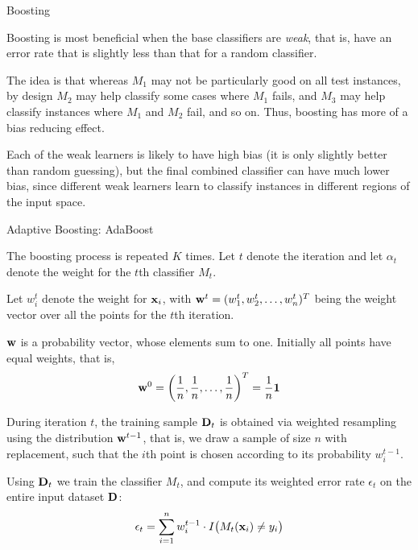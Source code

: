 \begin{frame}{Boosting}

  Boosting is most benef\/{i}cial when the base classif\/{i}ers are {\em
weak}, that is, have an error rate that is slightly less than that
for a random classif\/{i}er. 

\medskip
The idea is that whereas $M_1$ may not be
particularly good on all test instances, by design $M_2$ may help
classify some cases where $M_1$ fails, and $M_3$ may help classify
instances where
 $M_1$ and $M_2$ fail, and so on. Thus,
boosting has more of a bias reducing effect. 

\medskip
Each of the weak learners
is likely to have high bias (it is only slightly better than random
guessing), but the f\/{i}nal combined classif\/{i}er can have much lower bias,
since different weak learners learn to classify instances in
different regions of the input space.
\end{frame}



\begin{frame}{Adaptive Boosting: AdaBoost}

The boosting process is repeated $K$ times.
Let $t$ denote the iteration and let $\alpha_t$ denote the weight
for the $t$th classif\/{i}er $M_t$. 

\medskip
Let $w^t_i$ denote the weight for
$\mathbf{x}_i$, with $\mathbf{w}^t = (w^t_1, w^t_2, \ldots, w^t_n)^T$ being the
weight vector over all the points for the $t$th iteration. 

\medskip
$\mathbf{w}$ is a probability vector, whose elements sum to one.
Initially all points have equal weights, that is,
\begin{align*}
  \mathbf{w}^0 = \left(\frac{1}{n}, \frac{1}{n}, \ldots, \frac{1}{n}\right)^T =
  \frac{1}{n}\mathbf{1}
\end{align*}


\medskip
During iteration $t$, the
training sample $\mathbf{D}_{t}$ is obtained via weighted resampling
using the distribution $\mathbf{w}^{t-1}$, that is, we draw a sample of
size $n$ with replacement, such that the $i$th point is chosen
according to its probability $w^{t-1}_i$. 

\medskip
Using $\mathbf{D}_t$ we train the
classif\/{i}er $M_{t}$, and compute its weighted error
rate $\epsilon_{t}$ on the entire input dataset $\mathbf{D}$:
\begin{align*}
  \epsilon_t = \sum_{i=1}^n w^{t-1}_i \cdot I\bigl(M_t(\mathbf{x}_i) \ne y_i\bigr)
\end{align*}

\end{frame}



